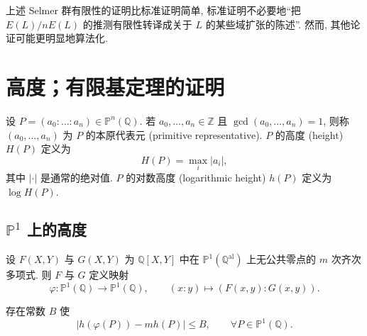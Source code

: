 \begin{aside} \label{thm:4.3.15} 
上述 Selmer 群有限性的证明比标准证明简单, 标准证明不必要地``把 $E(L)/nE(L)$ 的推测有限性转译成关于 $L$ 的某些域扩张的陈述''. 然而, 其他论证可能更明显地算法化.
\end{aside}

\section{高度；有限基定理的证明}\label{sec:4.4}

设 $P = (a_0:\dots:a_n)\in\mathbb{P}^n(\mathbb{Q})$. 若 $a_0, \dots, a_n\in\mathbb{Z}$ 且 $\gcd(a_0, \dots, a_n) = 1$, 则称 $(a_0, \dots, a_n)$ 为 $P$ 的本原代表元 (primitive representative). $P$ 的高度 (height) $H(P)$ 定义为
\[
H(P) = \max_i|a_i|,
\]
其中 $|\cdot|$ 是通常的绝对值. $P$ 的对数高度 (logarithmic height) $h(P)$ 定义为 $\log H(P)$.

\subsection*{$\mathbb{P}^1$ 上的高度}

设 $F(X, Y)$ 与 $G(X, Y)$ 为 $\mathbb{Q}[X, Y]$ 中在 $\mathbb{P}^1(\mathbb{Q}^{\mathrm{al}})$ 上无公共零点的 $m$ 次齐次多项式. 则 $F$ 与 $G$ 定义映射
\[
\varphi\colon\mathbb{P}^1(\mathbb{Q})\to\mathbb{P}^1(\mathbb{Q}), \qquad
(x:y)\mapsto(F(x,y):G(x,y)).
\]

\begin{lemma} \label{thm:4.4.1} 
存在常数 $B$ 使
\[
|h(\varphi(P)) - mh(P)|\le B, \qquad \forall P\in\mathbb{P}^1(\mathbb{Q}).
\]
\end{lemma}

